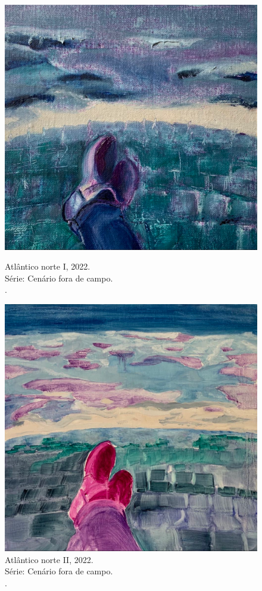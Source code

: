 \begin{figure}[t]
\begin{minipage}[b]{.3\linewidth}
	\includegraphics[width = \linewidth]{apendice/pinturas-finalizadas/boudet-atlantico-norte-i.pdf}
  \caption*{Atlântico norte I, 2022. \\ Série: Cenário fora de campo. \\ \oleolinho. \\ }
\end{minipage}\hfill
\begin{minipage}[b]{.65\linewidth}
	\includegraphics[width = \linewidth]{apendice/pinturas-finalizadas/boudet-atlantico-norte-ii.pdf}
  \caption*{Atlântico norte II, 2022. \\ Série: Cenário fora de campo. \\ \oleolinho. \\ }
\end{minipage}
\end{figure}


